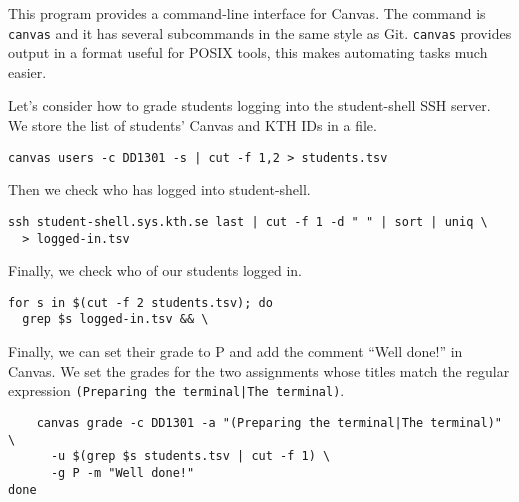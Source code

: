 
This program provides a command-line interface for Canvas.
The command is \texttt{canvas} and it has several subcommands in the same style 
as Git.
\texttt{canvas} provides output in a format useful for POSIX tools, this makes 
automating tasks much easier.

Let's consider how to grade students logging into the student-shell SSH server.
We store the list of students' Canvas and KTH IDs in a file.
\begin{verbatim}
canvas users -c DD1301 -s | cut -f 1,2 > students.tsv
\end{verbatim}
Then we check who has logged into student-shell.
\begin{verbatim}
ssh student-shell.sys.kth.se last | cut -f 1 -d " " | sort | uniq \
  > logged-in.tsv
\end{verbatim}
Finally, we check who of our students logged in.
\begin{verbatim}
for s in $(cut -f 2 students.tsv); do
  grep $s logged-in.tsv && \
\end{verbatim}
Finally, we can set their grade to P and add the comment \enquote{Well done!} 
in Canvas.
We set the grades for the two assignments whose titles match the regular 
expression \texttt{(Preparing the terminal|The terminal)}.
\begin{verbatim}
    canvas grade -c DD1301 -a "(Preparing the terminal|The terminal)" \
      -u $(grep $s students.tsv | cut -f 1) \
      -g P -m "Well done!"
done
\end{verbatim}


